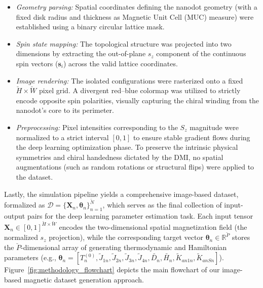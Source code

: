 \documentclass[a4paper,fleqn]{cas-sc}
\begin{document}
\begin{itemize}
    \item[--] \emph{Geometry parsing:} Spatial coordinates defining the nanodot geometry (with a fixed disk radius and thickness as Magnetic Unit Cell (MUC) measure) were established using a binary circular lattice mask.
    \item[--] \emph{Spin state mapping:} The topological structure was projected into two dimensions by extracting the out-of-plane $s_z$ component of the continuous spin vectors ($\mathbf{s}_i$) across the valid lattice coordinates. 
    \item[--] \emph{Image rendering:} The isolated configurations were rasterized onto a fixed $\breve{H} \times \breve{W}$ pixel grid. A divergent red--blue colormap was utilized to strictly encode opposite spin polarities, visually capturing the chiral winding from the nanodot's core to its perimeter.
    \item[--] \emph{Preprocessing:} Pixel intensities corresponding to the $S_z$ magnitude were normalized to a strict interval $[0, 1]$ to ensure stable gradient flows during the deep learning optimization phase. To preserve the intrinsic physical symmetries and chiral handedness dictated by the DMI, no spatial augmentations (such as random rotations or structural flips) were applied to the dataset.
\end{itemize}

Lastly, the simulation pipeline yields a comprehensive image-based dataset, formalized as $\mathcal{D} = \{\mathbf{X}_n, \boldsymbol{\theta}_n\}_{n=1}^{\breve{N}}$, which serves as the final collection of input-output pairs for the deep learning parameter estimation task. Each input tensor $\mathbf{X}_n \in [0,1]^{\breve{H} \times \breve{W}}$ encodes the two-dimensional spatial magnetization field (the normalized $s_z$ projection), while the corresponding target vector $\boldsymbol{\theta}_n \in \mathbb{R}^{\breve{P}}$ stores the $\breve{P}$-dimensional array of generating thermodynamic and Hamiltonian parameters (e.g., $\boldsymbol{\theta}_n = [T^{(0)}_n,\tilde{J}_{1n},\tilde{J}_{2n},\tilde{J}_{3n},\tilde{J}_{4n},\tilde{D_n},\tilde{H_n},\tilde{K}_{an1n},\tilde{K}_{anSn}]$). Figure~\ref{fig:methodology_flowchart} depicts the main flowchart of our image-based magnetic dataset generation approach.\\
\end{document}
